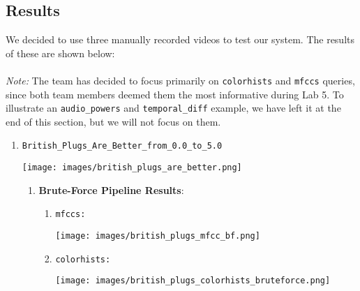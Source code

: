 \documentclass{article}
\begin{document}
\subsection*{Results} 
We decided to use three manually recorded videos to test our system. The results of these are shown below: \\
\\\textit{Note:} The team has decided to focus primarily on \texttt{colorhists} and \texttt{mfccs} queries, since both team members deemed them the most informative during Lab 5. To illustrate an \texttt{audio\_powers} and \texttt{temporal\_diff} example, we have left it at the end of this section, but we will not focus on them. \\
\begin{enumerate}
    \item\texttt{British\_Plugs\_Are\_Better\_from\_0.0\_to\_5.0} \begin{center}
        \texttt{[image: images/british\_plugs\_are\_better.png]}
    \end{center} \begin{enumerate}
        \item \textbf{Brute-Force Pipeline Results}: \begin{enumerate}
            \item \texttt{mfccs:}
            \begin{center}
                \texttt{[image: images/british\_plugs\_mfcc\_bf.png]}
            \end{center}
            \item \texttt{colorhists:} \begin{center}
                 \texttt{[image: images/british\_plugs\_colorhists\_bruteforce.png]}
                

\end{center}
\end{enumerate}
\end{enumerate}
\end{enumerate}
\end{document}
